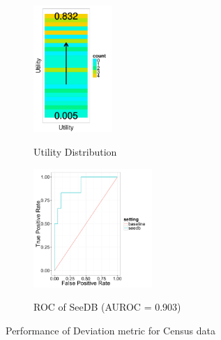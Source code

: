 \begin{figure}[t]
	\centering
	\begin{subfigure}{0.32\linewidth}
		{\includegraphics[trim={0 1.3cm 0 0}, clip, width=3cm]{Images/census_gt_distribution.pdf}}
		\caption{Utility Distribution}
		\label{fig:gt_dist}
	\end{subfigure}
	\begin{subfigure}{0.65\linewidth}
		\centering 
		{\includegraphics[width=4.5cm] {Images/seedb_roc.pdf}} 
		\caption{ROC of SeeDB (AUROC = 0.903)}
		\label{fig:roc}
	\end{subfigure}
	\vspace{-10pt}
	\caption{Performance of Deviation metric for Census data}
	\vspace{-20pt}
	\label{fig:census_gt}
\end{figure}


